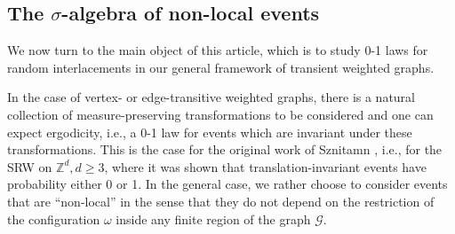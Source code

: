 \documentclass[12pt,a4paper]{article}
\newtheorem{remark}[theo]{Remark}
\newcommand{\1}[1]{{\mathbf 1}{\{#1\}}}
\newcommand{\Z}{{\mathbb Z}}
\newcommand{\8}{{\infty}}
\begin{document}




\subsection{The \texorpdfstring{$\sigma$}{sigma}-algebra of non-local events}\label{sec:intro_01laws}

We now turn to the main object of this article, which is to study 0-1 laws for random interlacements in our general framework of transient weighted graphs. 

In the case of vertex- or edge-transitive weighted graphs, there is a natural collection of measure-preserving transformations to be considered and one can expect ergodicity, i.e., a 0-1 law for events which are invariant under these transformations. This is the case for the original work of Sznitamn \cite{Sznitman2010}, i.e., for the SRW on $\Z^d, d\ge 3 $, where it was shown that translation-invariant events have probability either 0 or 1.  
In the general case, we rather choose to consider events that are ``non-local'' in the sense that they do not depend on the restriction of the configuration $\omega$ inside any finite region of the graph $\mathcal{G}$. 

\smallskip 
\end{document}
